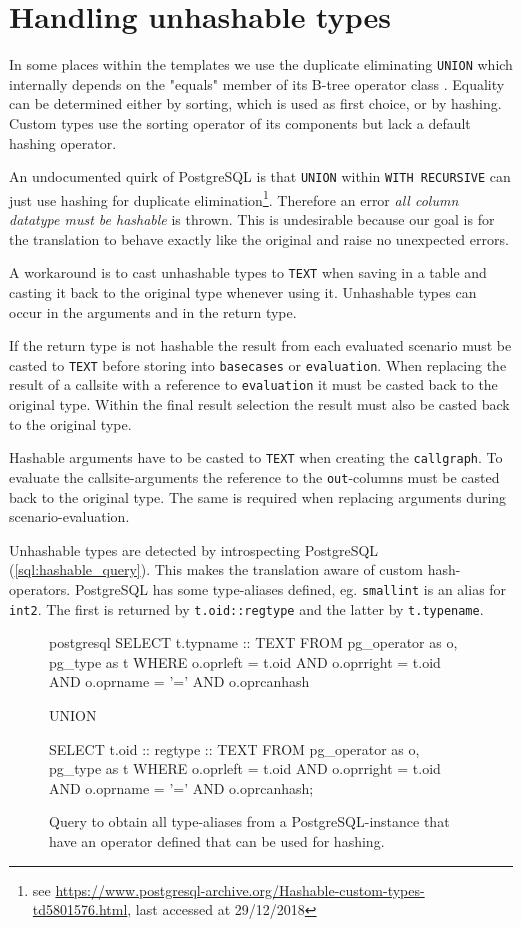 \section{Handling unhashable types}

In some places within the templates we use the duplicate eliminating \texttt{UNION} which internally depends on the "equals" member of its B-tree operator class \cite[p. 1042 f.]{psql}. Equality can be determined either by sorting, which is used as first choice, or by hashing. Custom types use the sorting operator of its components but lack a default hashing operator.

An undocumented quirk of PostgreSQL is that \texttt{UNION} within \texttt{WITH RECURSIVE} can just use hashing for duplicate elimination\footnote{see \url{https://www.postgresql-archive.org/Hashable-custom-types-td5801576.html}, last accessed at 29/12/2018}. Therefore an error \textit{all column datatype must be hashable} is thrown. This is undesirable because our goal is for the translation to behave exactly like the original and raise no unexpected errors.

A workaround is to cast unhashable types to \texttt{TEXT} when saving in a table and casting it back to the original type whenever using it. Unhashable types can occur in the arguments and in the return type.

If the return type is not hashable the result from each evaluated scenario must be casted to \texttt{TEXT} before storing into \texttt{basecases} or \texttt{evaluation}. When replacing the result of a callsite with a reference to \texttt{evaluation} it must be casted back to the original type. Within the final result selection the result must also be casted back to the original type.

Hashable arguments have to be casted to \texttt{TEXT} when creating the \texttt{callgraph}. To evaluate the callsite-arguments the reference to the \texttt{out}-columns must be casted back to the original type. The same is required when replacing arguments during scenario-evaluation.

Unhashable types are detected by introspecting PostgreSQL (\autoref{sql:hashable_query}). This makes the translation aware of custom hash-operators. PostgreSQL has some type-aliases defined, eg. \texttt{smallint} is an alias for \texttt{int2}. The first is returned by \texttt{t.oid::regtype} and the latter by \texttt{t.typename}.

\begin{figure}
    \centering
\begin{cminted}{postgresql}
SELECT t.typname :: TEXT 
FROM pg_operator as o, pg_type as t 
WHERE o.oprleft = t.oid 
  AND o.oprright = t.oid 
  AND o.oprname = '=' 
  AND o.oprcanhash 

UNION

SELECT t.oid :: regtype  :: TEXT 
FROM   pg_operator as o, pg_type as t 
WHERE o.oprleft = t.oid 
  AND o.oprright = t.oid 
  AND o.oprname = '=' 
  AND o.oprcanhash;
\end{cminted}
    \caption{Query to obtain all type-aliases from a PostgreSQL-instance that have an operator defined that can be used for hashing.}
    \label{sql:hashable_query}
\end{figure}